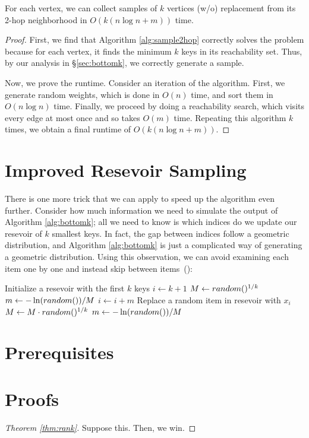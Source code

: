 \documentclass{article}
\begin{document}
\begin{theorem}
	For each vertex, we can collect samples of $k$ vertices (w/o) replacement from its 2-hop neighborhood in $O(k(n \log n + m))$ time.
\end{theorem}

\begin{proof}
	First, we find that Algorithm \ref{alg:sample2hop} correctly solves the problem because for each vertex, it finds the minimum $k$ keys in its reachability set.
	Thus, by our analysis in \S\ref{sec:bottomk}, we correctly generate a sample.

	Now, we prove the runtime.
	Consider an iteration of the algorithm.
	First, we generate random weights, which is done in $O(n)$ time, and sort them in $O(n \log n)$ time.
	Finally, we proceed by doing a reachability search, which visits every edge at most once and so takes $O(m)$ time.
	Repeating this algorithm $k$ times, we obtain a final runtime of $O(k(n \log n + m))$.
\end{proof}

\section{Improved Resevoir Sampling}
\label{sec:resevoir}

There is one more trick that we can apply to speed up the algorithm even further.
Consider how much information we need to simulate the output of Algorithm \ref{alg:bottomk}; all we need to know is which indices do we update our resevoir of $k$ smallest keys.
In fact, the gap between indices follow a geometric distribution, and Algorithm \ref{alg:bottomk} is just a complicated way of generating a geometric distribution.
Using this observation, we can avoid examining each item one by one and instead skip between items~(\cite{li94-12, efraimidis06-03}):
\begin{algorithm}
	\begin{algorithmic}[1]
			\State Initialize a resevoir with the first $k$ keys
			\State $i \gets k + 1$
			\State $M \gets \mathop{random}()^{1/k}$
			\State $m \gets - \ln( \mathop{random}() ) / M$
				\State $i \gets i + m$
				\State Replace a random item in resevoir with $x_{i}$
				\State $M \gets M \cdot \mathop{random}()^{1/k}$
				\State $m \gets - \ln( \mathop{random}() ) / M$
			\EndWhile
		\EndFunction
	\end{algorithmic}
	\label{alg:samplejumps}
\end{algorithm}

\section{Prerequisites}
\label{sec:prereq}

\section{Proofs}
\label{sec:proofs}

\begin{proof}[Theorem \ref{thm:rank}]
	Suppose this.
	Then, we win.
\end{proof}

\printbibliography
\end{document}
